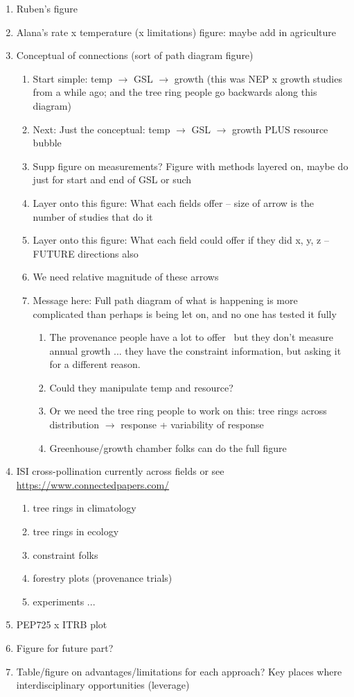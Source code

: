\documentclass[11pt,letter]{article}
\begin{document}
\begin{enumerate}
\item Ruben's figure
\item Alana's rate x temperature (x limitations) figure: maybe add in agriculture
\item Conceptual of connections (sort of path diagram figure)
\begin{enumerate}
\item Start simple: temp $\rightarrow$ GSL $\rightarrow$ growth (this was NEP x growth studies from a while ago; and the tree ring people go backwards along this diagram)
\item Next: Just the conceptual: temp $\rightarrow$ GSL $\rightarrow$ growth PLUS resource bubble
\item Supp figure on measurements? Figure with methods layered on, maybe do just for start and end of GSL or such
\item Layer onto this figure: What each fields offer -- size of arrow is the number of studies that do it
\item Layer onto this figure: What each field could offer if they did x, y, z -- FUTURE directions also
\item We need relative magnitude of these arrows
\item Message here: Full path diagram of what is happening is more complicated than perhaps is being let on, and no one has tested it fully
\begin{enumerate}
\item The provenance people have a lot to offer
\ but they don't measure annual growth ... they have the constraint information, but asking it for a different reason. 
\item Could they manipulate temp and resource?
\item Or we need the tree ring people to work on this: tree rings across distribution  $\rightarrow$ response + variability of response
\item Greenhouse/growth chamber folks can do the full figure
\end{enumerate}
\end{enumerate}
\item ISI cross-pollination currently across fields or see \url{https://www.connectedpapers.com/}
\begin{enumerate}
\item tree rings in climatology
\item tree rings in ecology
\item constraint folks
\item forestry plots (provenance trials)
\item experiments ... 
\end{enumerate}
\item PEP725 x ITRB plot
\item Figure for future part?
\item Table/figure on advantages/limitations for each approach? Key places where interdisciplinary opportunities (leverage)
\end{enumerate}
\end{document}
